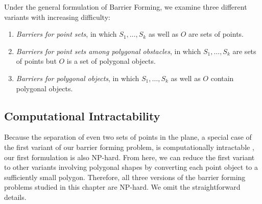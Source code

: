 Under the general formulation of Barrier Forming, we examine three different variants with increasing difficulty:
\begin{enumerate} 
\item \emph{Barriers for point sets}, in which  $S_1, \dots, S_k$ as well as $O$ are sets of points. 
\item \emph{Barriers for point sets among polygonal obstacles}, in which  $S_1, \dots, S_k$ are sets of points but $O$ is a set of polygonal objects. 
\item \emph{Barriers for polygonal objects}, in which $S_1, \dots, S_k$ as well as $O$ contain polygonal objects. 
\end{enumerate}

\subsection{Computational Intractability}
Because the separation of even two sets of points in the plane, 
a special case of the first variant of our barrier forming problem, 
is computationally intractable \cite{demaine2005separating}, 
our first formulation is also NP-hard. 
From here, we can reduce the first variant to other variants involving polygonal shapes by converting each point object to a sufficiently small polygon. 
Therefore, all three versions of the barrier forming problems studied in this chapter are NP-hard. We omit the straightforward details. 